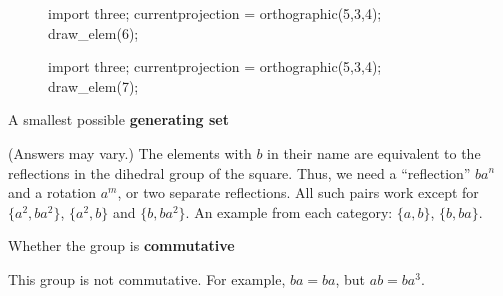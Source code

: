 \documentclass[../gatm_answers.tex]{subfiles}
\begin{document}
\begin{figure}[h]
	\begin{center}
		\begin{minipage}[b]{0.45\textwidth}
			\centering
			\begin{asy}[width=0.65\textwidth]
				import three;
				currentprojection = orthographic(5,3,4);
				draw_elem(6);
			\end{asy}
		\end{minipage}
		\hfill
		\begin{minipage}[b]{0.45\textwidth}
			\centering
			\begin{asy}[width=0.7\textwidth]
				import three;
				currentprojection = orthographic(5,3,4);
				draw_elem(7);
			\end{asy}
		\end{minipage}
	\end{center}
	\vspace*{-2\baselineskip}
	\begin{center}
		\begin{minipage}[t]{\textwidth}
			\label{fig:this_took_me_so_long}
		\end{minipage}
	\end{center}
	\vspace*{-2\baselineskip}
\end{figure}

\begin{inner_problem}
\item A smallest possible \textbf{generating set}
\end{inner_problem}

\noindent(Answers may vary.)
The elements with $b$ in their name are equivalent to the reflections in the dihedral group of the square. Thus, we need a ``reflection'' $ba^n$ and a rotation $a^m$, or two separate reflections. All such pairs work except for $\{a^2,ba^2\}$, $\{a^2,b\}$ and $\{b,ba^2\}$. An example from each category: $\{a,b\}$, $\{b,ba\}$.

\begin{inner_problem}
\item Whether the group is \textbf{commutative}
\end{inner_problem}

\noindent This group is not commutative. For example, $ba=ba$, but $ab=ba^3$.
\end{document}

